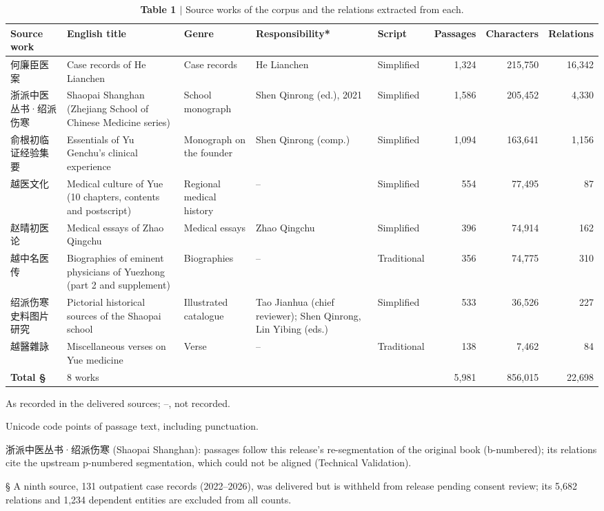 
\begin{table}[p]
\footnotesize
\begin{threeparttable}
\caption{\textbf{Table 1 $|$} Source works of the corpus and the relations extracted from each.}
\begin{tabularx}{\linewidth}{lllllrrr}
\toprule
Source work & English title & Genre & Responsibility* & Script & Passages & Characters\textdagger{} & Relations \\
\midrule
何廉臣医案 & Case records of He Lianchen & Case records & He Lianchen & Simplified & 1,324 & 215,750 & 16,342 \\
浙派中医丛书·绍派伤寒 \textdaggerdbl{} & Shaopai Shanghan (Zhejiang School of Chinese Medicine series) & School monograph & Shen Qinrong (ed.), 2021 & Simplified & 1,586 & 205,452 & 4,330 \\
俞根初临证经验集要 & Essentials of Yu Genchu's clinical experience & Monograph on the founder & Shen Qinrong (comp.) & Simplified & 1,094 & 163,641 & 1,156 \\
越医文化 & Medical culture of Yue (10 chapters, contents and postscript) & Regional medical history & -- & Simplified & 554 & 77,495 & 87 \\
赵晴初医论 & Medical essays of Zhao Qingchu & Medical essays & Zhao Qingchu & Simplified & 396 & 74,914 & 162 \\
越中名医传 & Biographies of eminent physicians of Yuezhong (part 2 and supplement) & Biographies & -- & Traditional & 356 & 74,775 & 310 \\
绍派伤寒史料图片研究 & Pictorial historical sources of the Shaopai school & Illustrated catalogue & Tao Jianhua (chief reviewer); Shen Qinrong, Lin Yibing (eds.) & Simplified & 533 & 36,526 & 227 \\
越醫雜詠 & Miscellaneous verses on Yue medicine & Verse & -- & Traditional & 138 & 7,462 & 84 \\
\textbf{Total \S{}} & 8 works &  &  &  & 5,981 & 856,015 & 22,698 \\
\bottomrule
\end{tabularx}
\begin{tablenotes}\footnotesize
\item * As recorded in the delivered sources; --, not recorded.
\item \textdagger{} Unicode code points of passage text, including punctuation.
\item \textdaggerdbl{} 浙派中医丛书·绍派伤寒 (Shaopai Shanghan): passages follow this release's re-segmentation of the original book (b-numbered); its relations cite the upstream p-numbered segmentation, which could not be aligned (Technical Validation).
\item \S{} A ninth source, 131 outpatient case records (2022--2026), was delivered but is withheld from release pending consent review; its 5,682 relations and 1,234 dependent entities are excluded from all counts.
\end{tablenotes}
\end{threeparttable}
\end{table}


